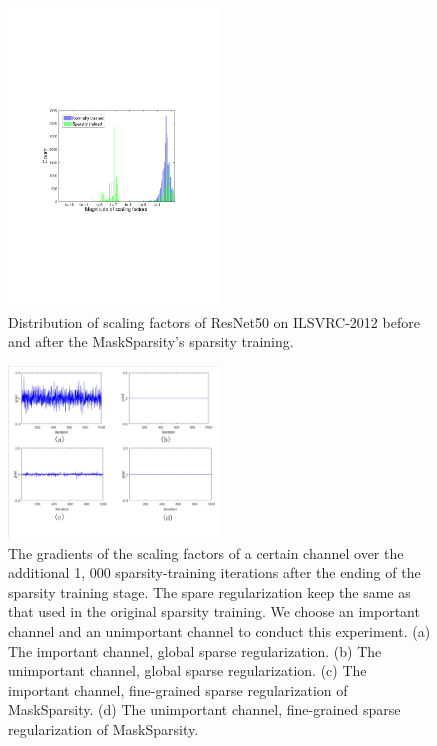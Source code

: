 \documentclass[review]{cvpr}
\begin{document}
 \begin{figure}[h!]
\begin{centering}
	\includegraphics[width=0.5\textwidth]{figure/solve_pbm_cropped.pdf} 
	\caption{Distribution of scaling factors of ResNet50 on ILSVRC-2012 before and after the MaskSparsity's sparsity training.}
	\label{dstbtion-mask-sp}
	\par\end{centering}
\end{figure}

\begin{figure}[h!]
	\begin{centering}
		\includegraphics[width=0.5\textwidth]{figure/grad2_cropped.pdf}
		\caption{The gradients of the scaling factors of a certain channel over the additional 1, 000 sparsity-training iterations after the ending of the sparsity training stage. The spare regularization keep the same as that used in the original sparsity training. We choose an important channel and an unimportant channel to conduct this experiment. (a) The important channel, global sparse regularization. (b) The unimportant channel, global sparse regularization. (c) The important channel, fine-grained sparse regularization of MaskSparsity. (d) The unimportant channel, fine-grained sparse regularization of MaskSparsity.}
		\label{grad}
		\par\end{centering}
\end{figure}
\end{document}
